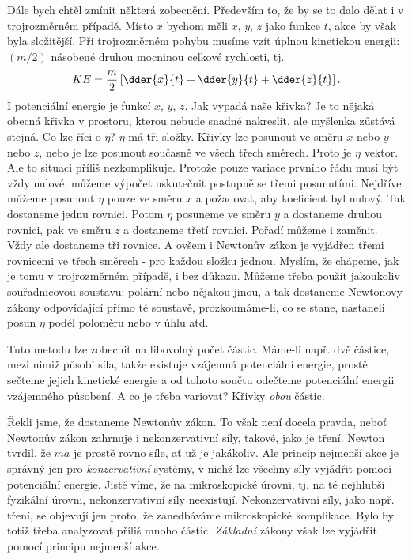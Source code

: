     Dále bych chtěl zmínit některá zobecnění. Především to, že by se to dalo dělat i v trojrozměrném
    případě. Místo \(x\) bychom měli \(x\), \(y\), \(z\) jako funkce \(t\), akce by však byla
    složitější. Při trojrozměrném pohybu musíme vzít úplnou kinetickou energii: \((m/2)\) násobené
    druhou mocninou celkové rychlosti, tj.
    \begin{equation*}
      KE = \dfrac{m}{2}\left[\dder{x}{t} +\dder{y}{t} + \dder{z}{t}\right].
    \end{equation*}
    I potenciální energie je funkcí \(x\), \(y\), \(z\). Jak vypadá naše křivka? Je to nějaká obecná
    křivka v prostoru, kterou nebude snadné nakreslit, ale myšlenka zůstává stejná. Co lze říci o
    \(\eta\)? \(\eta\) má tři složky. Křivky lze posunout ve směru \(x\) nebo \(y\) nebo \(z\), nebo
    je lze posunout současně ve všech třech směrech. Proto je \(\eta\) vektor. Ale to situaci příliš
    nezkomplikuje. Protože pouze variace prvního řádu musí být vždy nulové, můžeme výpočet
    uskutečnit postupně se třemi posunutími. Nejdříve můžeme posunout \(\eta\) pouze ve směru \(x\)
    a požadovat, aby koeficient byl nulový. Tak dostaneme jednu rovnici. Potom \(\eta\) posuneme ve
    směru \(y\) a dostaneme druhou rovnici, pak ve směru \(z\) a dostaneme třetí rovnici. Pořadí
    můžeme i zaměnit. Vždy ale dostaneme tři rovnice. A ovšem i Newtonův zákon je vyjádřen třemi
    rovnicemi ve třech směrech - pro každou složku jednou. Myslím, že chápeme, jak je tomu v
    trojrozměrném případě, i bez důkazu. Můžeme třeba použít jakoukoliv souřadnicovou soustavu:
    polární nebo nějakou jinou, a tak dostaneme Newtonovy zákony odpovídající přímo té soustavě,
    prozkoumáme-li, co se stane, nastaneli posun \(\eta\) podél poloměru nebo v úhlu atd.

    Tuto metodu lze zobecnit na libovolný počet částic. Máme-li např. dvě částice, mezi nimiž
    působí síla, takže existuje vzájemná potenciální energie, prostě sečteme jejich kinetické
    energie a od tohoto součtu odečteme potenciální energii vzájemného působení. A co je třeba
    variovat? Křivky \emph{obou} částic.

    Řekli jsme, že dostaneme Newtonův zákon. To však není docela pravda, neboť Newtonův zákon
    zahrnuje i nekonzervativní síly, takové, jako je tření. Newton tvrdil, že \(ma\) je prostě rovno
    síle, ať už je jakákoliv. Ale princip nejmenší akce je správný jen pro \emph{konzervativní}
    systémy, v nichž lze všechny síly vyjádřit pomocí potenciální energie. Jistě víme, že na
    mikroskopické úrovni, tj. na té nejhlubší fyzikální úrovni, nekonzervativní síly neexistují.
    Nekonzervativní síly, jako např. tření, se objevují jen proto, že zanedbáváme mikroskopické
    komplikace. Bylo by totiž třeba analyzovat příliš mnoho částic. \emph{Základní} zákony však lze
    vyjádřit pomocí principu nejmenší akce.

